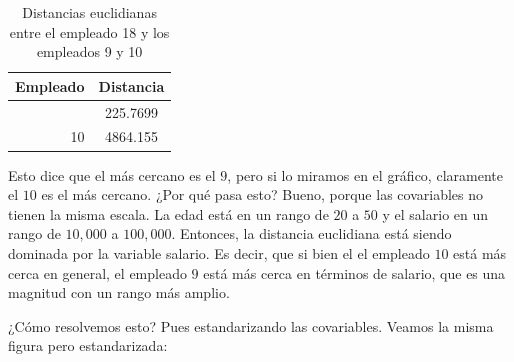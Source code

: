 \documentclass[
  letterpaper,
  DIV=11,
  numbers=noendperiod,
  oneside]{scrreprt}
\begin{document}
\begin{table}
\caption*{
{\large Distancias euclidianas entre el empleado 18 y los empleados 9 y 10}
} 
\fontsize{12.0pt}{14.4pt}\selectfont
\begin{tabular*}{\linewidth}{@{\extracolsep{\fill}}rc}
\toprule
Empleado & Distancia \\ 
\midrule\addlinespace[2.5pt]
9 & 225.7699 \\ 
10 & 4864.155 \\ 
\bottomrule
\end{tabular*}
\end{table}

Esto dice que el más cercano es el \(9\), pero si lo miramos en el
gráfico, claramente el \(10\) es el más cercano. ¿Por qué pasa esto?
Bueno, porque las covariables no tienen la misma escala. La edad está en
un rango de \(20\) a \(50\) y el salario en un rango de \(10,000\) a
\(100,000\). Entonces, la distancia euclidiana está siendo dominada por
la variable salario. Es decir, que si bien el el empleado \(10\) está
más cerca en general, el empleado \(9\) está más cerca en términos de
salario, que es una magnitud con un rango más amplio.

¿Cómo resolvemos esto? Pues estandarizando las covariables.
Veamos la misma figura pero estandarizada:
\end{document}
